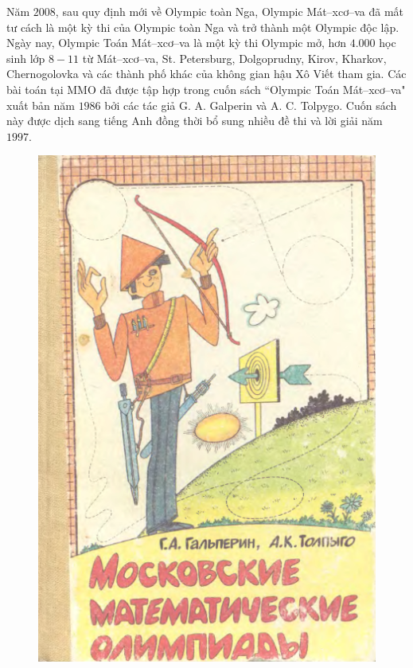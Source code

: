\begin{multicols}{2}
	\vskip 0.1cm
	Năm $2008$, sau quy định mới về Olympic toàn Nga, Olympic Mát--xcơ--va đã mất tư cách là một kỳ thi của Olympic toàn Nga và trở thành một Olympic độc lập.
	\vskip 0.1cm
	Ngày nay, Olympic Toán Mát--xcơ--va là một kỳ thi Olympic mở, hơn $4{.}000$ học sinh lớp $8-11$ từ Mát--xcơ--va, St. Petersburg, Dolgoprudny, Kirov, Kharkov, Chernogolovka và các thành phố khác của không gian hậu Xô Viết tham gia.
	\vskip 0.1cm
	Các bài toán tại MMO đã được tập hợp trong cuốn sách ``Olympic Toán Mát--xcơ--va" xuất bản năm $1986$ bởi các tác giả G. A. Galperin và A. C. Tolpygo. Cuốn sách này được dịch sang tiếng Anh đồng thời bổ sung nhiều đề thi và lời giải năm $1997$. 
	\begin{figure}[H]
		\vspace*{5pt}
		\centering
		\captionsetup{labelformat= empty, justification=centering}
		\includegraphics[width= 1\linewidth]{2}

\end{figure}
\end{multicols}
